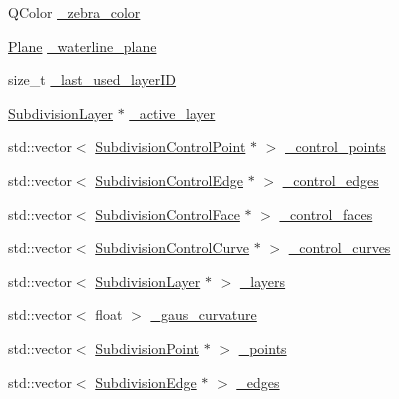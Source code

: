 \begin{DoxyCompactItemize}
\item 
Q\+Color \hyperlink{classShipCAD_1_1SubdivisionSurface_a047d5d0575c944d216ada589e30ee3bd}{\+\_\+zebra\+\_\+color}
\item 
\hyperlink{classShipCAD_1_1Plane}{Plane} \hyperlink{classShipCAD_1_1SubdivisionSurface_a762de21a330588c7bfbe081637cab2f3}{\+\_\+waterline\+\_\+plane}
\item 
size\+\_\+t \hyperlink{classShipCAD_1_1SubdivisionSurface_a0ba5c4e08110400890eb60140f3e2058}{\+\_\+last\+\_\+used\+\_\+layer\+ID}
\item 
\hyperlink{classShipCAD_1_1SubdivisionLayer}{Subdivision\+Layer} $\ast$ \hyperlink{classShipCAD_1_1SubdivisionSurface_aef766e0b62189247c0f3214c56800040}{\+\_\+active\+\_\+layer}
\item 
std\+::vector$<$ \hyperlink{classShipCAD_1_1SubdivisionControlPoint}{Subdivision\+Control\+Point} $\ast$ $>$ \hyperlink{classShipCAD_1_1SubdivisionSurface_a906d5981dc482ede1bb3c7256e750945}{\+\_\+control\+\_\+points}
\item 
std\+::vector$<$ \hyperlink{classShipCAD_1_1SubdivisionControlEdge}{Subdivision\+Control\+Edge} $\ast$ $>$ \hyperlink{classShipCAD_1_1SubdivisionSurface_ac6b2950f05e07f5a7814b278a9dc1513}{\+\_\+control\+\_\+edges}
\item 
std\+::vector$<$ \hyperlink{classShipCAD_1_1SubdivisionControlFace}{Subdivision\+Control\+Face} $\ast$ $>$ \hyperlink{classShipCAD_1_1SubdivisionSurface_a69c240904f61f8181a57559d4fa548c0}{\+\_\+control\+\_\+faces}
\item 
std\+::vector$<$ \hyperlink{classShipCAD_1_1SubdivisionControlCurve}{Subdivision\+Control\+Curve} $\ast$ $>$ \hyperlink{classShipCAD_1_1SubdivisionSurface_a72da0f8a60e186e10b88f48950a490e9}{\+\_\+control\+\_\+curves}
\item 
std\+::vector$<$ \hyperlink{classShipCAD_1_1SubdivisionLayer}{Subdivision\+Layer} $\ast$ $>$ \hyperlink{classShipCAD_1_1SubdivisionSurface_a87c6c8b63f203d788b8f4b361c814c96}{\+\_\+layers}
\item 
std\+::vector$<$ float $>$ \hyperlink{classShipCAD_1_1SubdivisionSurface_a20cbcc689f7b2f8af21f502748521185}{\+\_\+gaus\+\_\+curvature}
\item 
std\+::vector$<$ \hyperlink{classShipCAD_1_1SubdivisionPoint}{Subdivision\+Point} $\ast$ $>$ \hyperlink{classShipCAD_1_1SubdivisionSurface_ab03b7f4694a63eeb3ebb831484cb1bff}{\+\_\+points}
\item 
std\+::vector$<$ \hyperlink{classShipCAD_1_1SubdivisionEdge}{Subdivision\+Edge} $\ast$ $>$ \hyperlink{classShipCAD_1_1SubdivisionSurface_a709c44779394f03c06c16adba6187ecd}{\+\_\+edges}

\end{DoxyCompactItemize}

